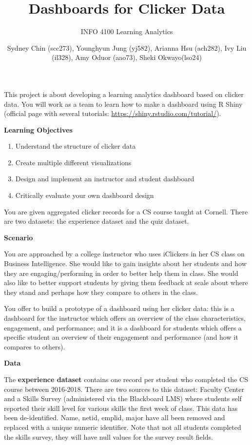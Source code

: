 \documentclass[
]{article}
\title{Dashboards for Clicker Data}
\subtitle{INFO 4100 Learning Analytics}
\author{Sydney Chin (scc273), Younghyun Jung (yj582), Arianna Hsu
(ach282), Ivy Liu (il328), Amy Oduor (aao73), Sheki Okwayo(lso24)}
\date{}
\providecommand{\tightlist}{%
  \setlength{\itemsep}{0pt}\setlength{\parskip}{0pt}}
\begin{document}
\maketitle

This project is about developing a learning analytics dashboard based on
clicker data. You will work as a team to learn how to make a dashboard
using R Shiny (official page with several tutorials:
\url{https://shiny.rstudio.com/tutorial/}).

\textbf{Learning Objectives}

\begin{enumerate}
\def\labelenumi{\arabic{enumi}.}
\tightlist
\item
  Understand the structure of clicker data
\item
  Create multiple different visualizations
\item
  Design and implement an instructor and student dashboard
\item
  Critically evaluate your own dashboard design
\end{enumerate}

You are given aggregated clicker records for a CS course taught at
Cornell. There are two datasets: the experience dataset and the quiz
dataset.

\textbf{Scenario}

You are approached by a college instructor who uses iClickers in her CS
class on Business Intelligence. She would like to gain insights about
her students and how they are engaging/performing in order to better
help them in class. She would also like to better support students by
giving them feedback at scale about where they stand and perhaps how
they compare to others in the class.

You offer to build a prototype of a dashboard using her clicker data:
this is a dashboard for the instructor which offers an overview of the
class characteristics, engagement, and performance; and it is a
dashboard for students which offers a specific student an overview of
their engagement and performance (and how it compares to others).

\textbf{Data}

The \textbf{experience dataset} contains one record per student who
completed the CS course between 2016-2018. There are two sources to this
dataset: Faculty Center and a Skills Survey (administered via the
Blackboard LMS) where students self reported their skill level for
various skills the first week of class. This data has been
de-identified. Name, netid, emplid, major have all been removed and
replaced with a unique numeric identifier. Note that not all students
completed the skills survey, they will have null values for the survey
result fields.
\end{document}
